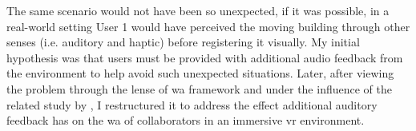 The same scenario would not have been so unexpected, if it was possible, in a real-world setting \textemdash User 1 would have perceived the moving building through other senses (i.e. auditory and haptic) before registering it visually. 
My initial hypothesis was that users must be provided with additional audio feedback from the environment to help avoid such unexpected situations. Later, after viewing the problem through the lense of \gls{wa} framework and under the influence of the related study by \parencite{gutwin_chalk_2011},  I restructured it to address the effect additional auditory feedback has on the \gls{wa} of collaborators in an immersive \gls{vr} environment.

 


